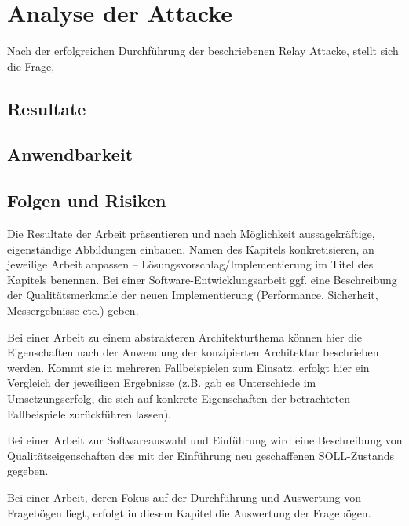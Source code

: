 \chapter{Analyse der Attacke}
\label{sec:results}

Nach der erfolgreichen Durchführung der beschriebenen Relay Attacke, stellt sich die Frage, 
\section{Resultate}

\section{Anwendbarkeit}

\section{Folgen und Risiken}
Die Resultate der Arbeit präsentieren und nach Möglichkeit aussagekräftige, eigenständige Abbildungen einbauen. Namen des Kapitels konkretisieren, an jeweilige Arbeit anpassen -- Lösungsvorschlag/Implementierung im Titel des Kapitels benennen.
\makeatletter\ifthesis@masterthesis
Bei einer Soft\-ware-Ent\-wicklungs\-arbeit ggf. eine Beschreibung der Qualitätsmerkmale der neuen Implementierung (Performance, Sicherheit, Messergebnisse etc.) geben.

Bei einer Arbeit zu einem abstrakteren Architekturthema können hier die Eigenschaften nach der Anwendung der konzipierten Architektur beschrieben werden. Kommt sie in mehreren Fallbeispielen zum Einsatz, erfolgt hier ein Vergleich der jeweiligen Ergebnisse (z.B. gab es Unterschiede im Umsetzungserfolg, die sich auf konkrete Eigenschaften der betrachteten Fallbeispiele zurückführen lassen).

Bei einer Arbeit zur Softwareauswahl und Einführung wird eine Beschreibung von Qualitätseigenschaften des mit der Einführung neu geschaffenen SOLL-Zustands gegeben.

Bei einer Arbeit, deren Fokus auf der Durchführung und Auswertung von Fragebögen liegt, erfolgt in diesem Kapitel die Auswertung der Fragebögen.
\fi\makeatother